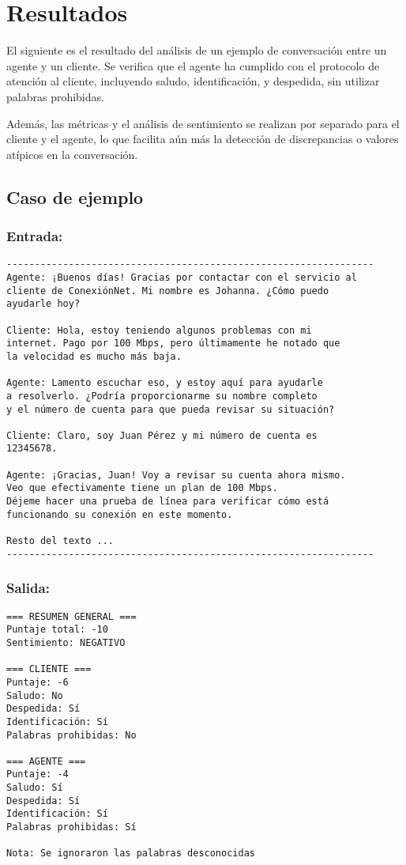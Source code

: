 \section{Resultados}
El siguiente es el resultado del análisis de un ejemplo de conversación entre un agente y un
cliente. Se verifica que el agente ha cumplido con el protocolo de atención al cliente,
incluyendo saludo, identificación, y despedida, sin utilizar palabras prohibidas.

Además, las métricas y el análisis de sentimiento se realizan por separado para el cliente y el
agente, lo que facilita aún más la detección de discrepancias o valores atípicos en la
conversación.

\subsection{Caso de ejemplo}
\subsubsection*{Entrada:}
\begin{verbatim}
-----------------------------------------------------------------    
Agente: ¡Buenos días! Gracias por contactar con el servicio al 
cliente de ConexiónNet. Mi nombre es Johanna. ¿Cómo puedo 
ayudarle hoy?

Cliente: Hola, estoy teniendo algunos problemas con mi 
internet. Pago por 100 Mbps, pero últimamente he notado que 
la velocidad es mucho más baja.

Agente: Lamento escuchar eso, y estoy aquí para ayudarle 
a resolverlo. ¿Podría proporcionarme su nombre completo 
y el número de cuenta para que pueda revisar su situación?

Cliente: Claro, soy Juan Pérez y mi número de cuenta es 
12345678.

Agente: ¡Gracias, Juan! Voy a revisar su cuenta ahora mismo.
Veo que efectivamente tiene un plan de 100 Mbps. 
Déjeme hacer una prueba de línea para verificar cómo está 
funcionando su conexión en este momento.

Resto del texto ... 
-----------------------------------------------------------------    
\end{verbatim}

\subsubsection*{Salida:}
\begin{tcolorbox}[colback=gray!10, colframe=gray!80, sharp corners, boxrule=0.5pt]
	\begin{verbatim}
=== RESUMEN GENERAL ===
Puntaje total: -10
Sentimiento: NEGATIVO

=== CLIENTE ===
Puntaje: -6
Saludo: No
Despedida: Sí
Identificación: Sí
Palabras prohibidas: No

=== AGENTE ===
Puntaje: -4
Saludo: Sí
Despedida: Sí
Identificación: Sí
Palabras prohibidas: Sí

Nota: Se ignoraron las palabras desconocidas
          \end{verbatim}
\end{tcolorbox}

